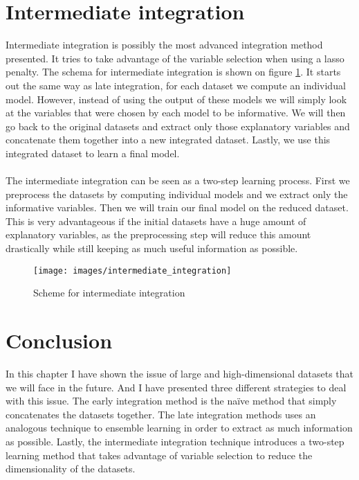 \section{Intermediate integration}
\label{sec:integration-intermediate}
Intermediate integration is possibly the most advanced integration method presented. It tries to take advantage of the variable selection when using a lasso penalty. The schema for intermediate integration is shown on figure \ref{fig:integration-intermediate}. It starts out the same way as late integration, for each dataset we compute an individual model. However, instead of using the output of these models we will simply look at the variables that were chosen by each model to be informative. We will then go back to the original datasets and extract only those explanatory variables and concatenate them together into a new integrated dataset. Lastly, we use this integrated dataset to learn a final model. \\ \\
The intermediate integration can be seen as a two-step learning process. First we preprocess the datasets by computing individual models and we extract only the informative variables. Then we will train our final model on the reduced dataset. This is very advantageous if the initial datasets have a huge amount of explanatory variables, as the preprocessing step will reduce this amount drastically while still keeping as much useful information as possible.
\begin{figure}
	\centering
	\texttt{[image: images/intermediate\_integration]}
	\caption{Scheme for intermediate integration}
	\label{fig:integration-intermediate}
\end{figure}
\section{Conclusion}
\label{sec:integration-conclusion}
In this chapter I have shown the issue of large and high-dimensional datasets that we will face in the future. And I have presented three different strategies to deal with this issue. The early integration method is the na\"{i}ve method that simply concatenates the datasets together. The late integration methods uses an analogous technique to ensemble learning in order to extract as much information as possible. Lastly, the intermediate integration technique introduces a two-step learning method that takes advantage of variable selection to reduce the dimensionality of the datasets.
